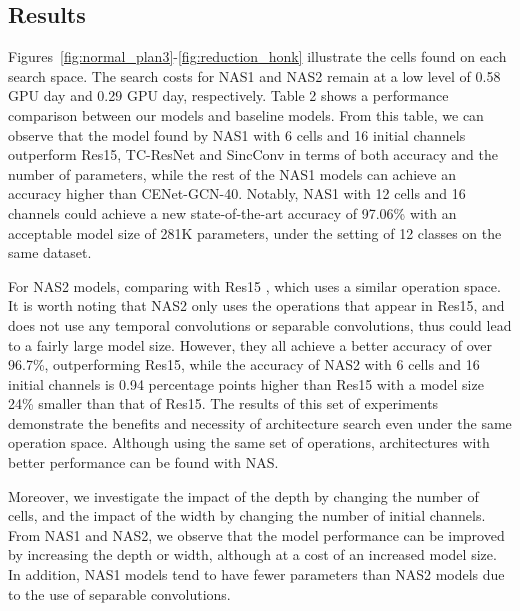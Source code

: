 \documentclass[a4paper]{article}
\begin{document}
\subsection{Results}

Figures~\ref{fig:normal_plan3}-\ref{fig:reduction_honk} illustrate the cells found on each search space. The search costs for NAS1 and NAS2 remain at a low level of 0.58 GPU day and 0.29 GPU day, respectively. Table 2 shows a performance comparison between our models and baseline models. 
From this table, we can observe that the model found by NAS1 with 6 cells and 16 initial channels outperform Res15, TC-ResNet and SincConv in terms of both accuracy and the number of parameters, while the rest of the NAS1 models can achieve an accuracy higher than CENet-GCN-40. Notably, NAS1 with 12 cells and 16 channels could achieve a new state-of-the-art accuracy of 97.06\% with an acceptable model size of 281K parameters, under the setting of 12 classes on the same dataset.

For NAS2 models, comparing with Res15 \cite{tang2018deep}, which uses a similar operation space. It is worth noting that NAS2 only uses the operations that appear in Res15, and does not use any temporal convolutions or separable convolutions, thus could lead to a fairly large model size.
However, they all achieve a better accuracy of over 96.7\%, outperforming Res15,
while the accuracy of NAS2 with 6 cells and 16 initial channels is 0.94 percentage points higher than Res15 with a model size 24\% smaller than that of Res15. The results of this set of experiments demonstrate the benefits and necessity of architecture search even under the same operation space. Although using the same set of operations, architectures with better performance can be found with NAS.


Moreover, we investigate the impact of the depth by changing the number of cells, and the impact of the width by changing the number of initial channels. From NAS1 and NAS2, we observe that the model performance can be improved by increasing the depth or width, although at a cost of an increased model size. 
In addition, NAS1 models tend to have fewer parameters than NAS2 models due to the use of separable convolutions. 
\end{document}
